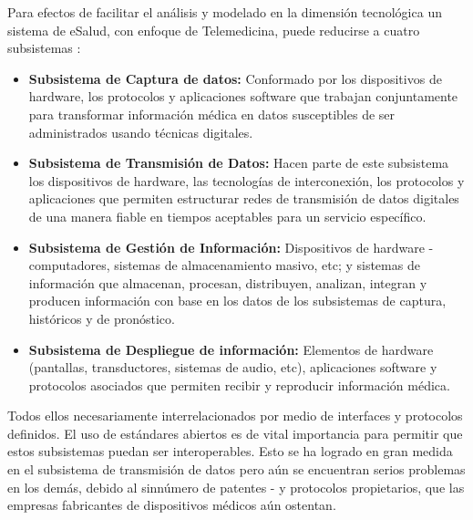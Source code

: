 Para efectos de facilitar el análisis y modelado en la dimensión tecnológica un sistema de eSalud, con enfoque de Telemedicina, puede reducirse a cuatro subsistemas \cite{aparicio2003}:

\begin{itemize}
 \item \textbf{Subsistema de Captura de datos:} Conformado por los dispositivos de hardware, los protocolos y aplicaciones software que trabajan conjuntamente para transformar información médica en datos susceptibles de ser administrados usando técnicas digitales.
 \item \textbf{Subsistema de Transmisión de Datos:} Hacen parte de este subsistema los dispositivos de hardware, las tecnologías de interconexión, los protocolos y aplicaciones que permiten estructurar redes de transmisión de datos digitales de una manera fiable en tiempos aceptables para un servicio específico.
 \item \textbf{Subsistema de Gestión de Información:} Dispositivos de hardware - computadores, sistemas de almacenamiento masivo, etc; y  sistemas de información que almacenan, procesan, distribuyen, analizan, integran y producen información con base en los datos de los subsistemas de captura, históricos y de pronóstico.
 \item \textbf{Subsistema de Despliegue de información:} Elementos de hardware (pantallas, transductores, sistemas de audio, etc), aplicaciones software y protocolos asociados que permiten recibir y reproducir información médica. 
\end{itemize}

Todos ellos necesariamente interrelacionados por medio de interfaces y protocolos definidos. El uso de estándares abiertos es de vital importancia para permitir que estos subsistemas puedan ser interoperables. Esto se ha logrado en gran medida en el subsistema de transmisión de datos pero aún se encuentran serios problemas en los demás, debido al sinnúmero de patentes - y protocolos propietarios, que las empresas fabricantes de dispositivos médicos aún ostentan.